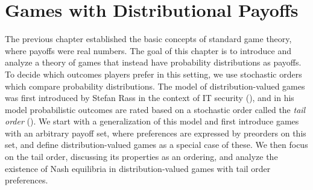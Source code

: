\documentclass[a4paper]{scrreprt}
\theoremstyle{definition}
\begin{document}
    \chapter{Games with Distributional Payoffs}
    The previous chapter established the basic concepts of standard game theory, where payoffs were real numbers.
    The goal of this chapter is to introduce and analyze a theory of games that instead have probability distributions as payoffs.
    To decide which outcomes players prefer in this setting, we use stochastic orders which compare probability distributions.
    The model of distribution-valued games was first introduced by Stefan Rass
    in the context of IT security (\cite{bib:rassGameRiskManagI,bib:rassGameRiskManagII,bib:rassGameRiskManagIII}), and in his model probabilistic outcomes are rated based on a stochastic order called the \emph{tail order} (\cite{bib:rassTotalOrderingOnLossDistributions}).
    We start with a generalization of this model and first introduce games with an arbitrary payoff set, where preferences are expressed by preorders on this set, and define distribution-valued games as a special case of these.
    We then focus on the tail order, discussing its properties as an ordering, and analyze the existence of Nash equilibria in distribution-valued games with tail order preferences.
    
\end{document}
